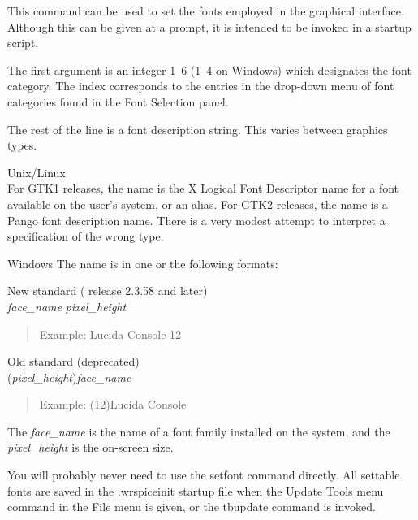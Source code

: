 This command can be used to set the fonts employed in the graphical
interface.  Although this can be given at a prompt, it is intended to
be invoked in a startup script.

The first argument is an integer 1--6 (1--4 on Windows) which
designates the font category.  The index corresponds to the entries in
the drop-down menu of font categories found in the Font Selection
panel.

The rest of the line is a font description string.  This varies
between graphics types.

\begin{description}
\item{Unix/Linux}\\
For GTK1 releases, the name is the X Logical Font Descriptor name for
a font available on the user's system, or an alias.  For GTK2
releases, the name is a Pango font description name.  There is a very
modest attempt to interpret a specification of the wrong type.
  
\item{Windows}
The name is in one or the following formats:
 \begin{description}
 \item{New standard ({\WRspice} release 2.3.58 and later)}\\
 {\it face\_name} {\it pixel\_height}
 \begin{quote}
 Example: {\vt Lucida Console 12}
 \end{quote}

 \item{Old standard (deprecated)}\\
 ({\it pixel\_height\/}){\it face\_name}
 \begin{quote}
 Example: {\vt (12)Lucida Console}
 \end{quote}
 \end{description}

 The {\it face\_name} is the name of a font family installed on the
 system, and the {\it pixel\_height} is the on-screen size.
\end{description}

You will probably never need to use the {\cb setfont} command
directly.  All settable fonts are saved in the {\vt .wrspiceinit}
startup file when the {\cb Update Tools} menu command in the {\cb
File} menu is given, or the {\cb tbupdate} command is invoked.

\subsection{}

